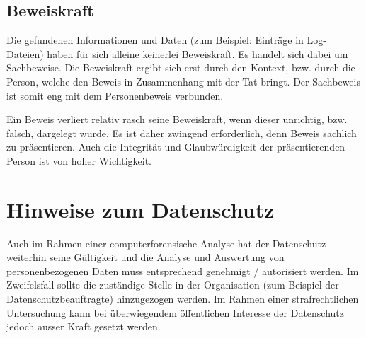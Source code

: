 \subsection{Beweiskraft}
Die gefundenen Informationen und Daten (zum Beispiel: Einträge in Log-Dateien) haben für sich alleine keinerlei Beweiskraft. Es handelt sich dabei um Sachbeweise. Die Beweiskraft ergibt sich erst durch den Kontext, bzw. durch die Person, welche den Beweis in Zusammenhang mit der Tat bringt. Der Sachbeweis ist somit eng mit dem Personenbeweis verbunden.

Ein Beweis verliert relativ rasch seine Beweiskraft, wenn dieser unrichtig, bzw. falsch, dargelegt wurde. Es ist daher zwingend erforderlich, denn Beweis sachlich zu präsentieren. Auch die Integrität und Glaubwürdigkeit der präsentierenden Person ist von hoher Wichtigkeit.

\section{Hinweise zum Datenschutz}
Auch im Rahmen einer computerforensische Analyse hat der Datenschutz weiterhin seine Gültigkeit und die Analyse und Auswertung von personenbezogenen Daten muss entsprechend genehmigt / autorisiert werden. Im Zweifelsfall sollte die zuständige Stelle in der Organisation (zum Beispiel der Datenschutzbeauftragte) hinzugezogen werden. Im Rahmen einer strafrechtlichen Untersuchung kann bei überwiegendem öffentlichen Interesse der Datenschutz jedoch ausser Kraft gesetzt werden.